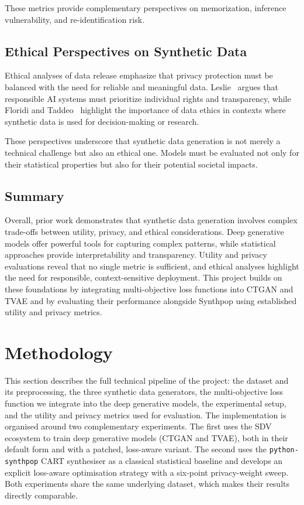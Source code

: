 \documentclass[11pt]{article}
\begin{document}
These metrics provide complementary perspectives on memorization, inference vulnerability, and re-identification risk.

\subsection{Ethical Perspectives on Synthetic Data}

Ethical analyses of data release emphasize that privacy protection must be balanced with the need for reliable and meaningful data. Leslie~\cite{leslie2020ethics} argues that responsible AI systems must prioritize individual rights and transparency, while Floridi and Taddeo~\cite{floridi2016data} highlight the importance of data ethics in contexts where synthetic data is used for decision-making or research.

These perspectives underscore that synthetic data generation is not merely a technical challenge but also an ethical one. Models must be evaluated not only for their statistical properties but also for their potential societal impacts.

\subsection{Summary}

Overall, prior work demonstrates that synthetic data generation involves complex trade-offs between utility, privacy, and ethical considerations. Deep generative models offer powerful tools for capturing complex patterns, while statistical approaches provide interpretability and transparency. Utility and privacy evaluations reveal that no single metric is sufficient, and ethical analyses highlight the need for responsible, context-sensitive deployment. This project builds on these foundations by integrating multi-objective loss functions into CTGAN and TVAE and by evaluating their performance alongside Synthpop using established utility and privacy metrics.


\section{Methodology}

This section describes the full technical pipeline of the project: the dataset and its preprocessing, the three synthetic data generators, the multi-objective loss function we integrate into the deep generative models, the experimental setup, and the utility and privacy metrics used for evaluation. The implementation is organised around two complementary experiments. The first uses the SDV ecosystem to train deep generative models (CTGAN and TVAE), both in their default form and with a patched, loss-aware variant. The second uses the \texttt{python-synthpop} CART synthesiser as a classical statistical baseline and develops an explicit loss-aware optimisation strategy with a six-point privacy-weight sweep. Both experiments share the same underlying dataset, which makes their results directly comparable.
\end{document}

